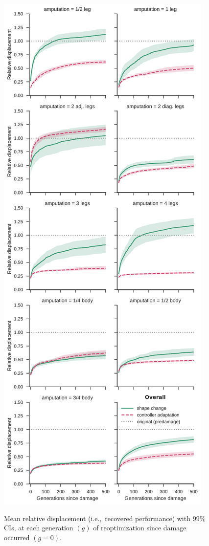 

\begin{figure}
\begin{center}
\includegraphics[width=0.5\linewidth]{Chapter05/fig/RSS_Recovery.pdf}\\
\caption{\label{fig:recovery}
Mean relative displacement (i.e.,~recovered performance) with 99\% CIs,
at each generation $(g)$ of reoptimization since damage occurred $(g=0)$.
}
\end{center}
\end{figure}

